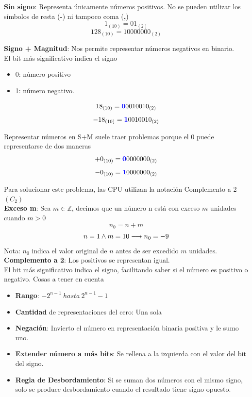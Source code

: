 \documentclass[10pt,a4paper]{article}
\begin{document}
\textbf{Sin signo}: Representa únicamente números positivos. No se pueden utilizar los símbolos de resta (\textbf{-}) ni tampoco coma (\textbf{,})
\[1_{(10)} = 01_{(2)}\]
\[128_{(10)} = 1000 0000_{(2)}\]

\textbf{Signo + Magnitud}: Nos permite representar números negativos en binario. \\ El bit más significativo indica el signo
\begin{itemize}
    \item 0: número positivo
    \item 1: número negativo.
\end{itemize}

\[18_{(10)} = \textcolor{blue}{\textbf{0}}0010010_{(2)}\]
\[-18_{(10)} = \textcolor{blue}{\textbf{1}}0010010_{(2)}\]

Representar números en S+M suele traer problemas porque el 0 puede representarse de dos maneras
\[+0_{(10)} = \textcolor{blue}{\textbf{0}}0000000_{(2)}\]
\[-0_{(10)} = \textcolor{blue}{\textbf{1}}0000000_{(2)}\]

Para solucionar este problema, las CPU utilizan la notación Complemento a 2 \((C_{2})\) \\

\textbf{Exceso m}: Sea \( m \in \mathbb{Z} \), decimos que un número n está con exceso \(m\) unidades cuando \(m>0\) 
\[n_{0}=n+m\]
\[n=1 \land m=10 \longrightarrow n_{0}=-9 \]
Nota: \(n_{0}\) indica el valor original de \(n\)  antes de ser excedido \(m\) unidades.  \\

\textbf{Complemento a 2}: Los positivos se representan igual. \\ 
El bit más significativo indica el signo, facilitando saber si el número es positivo o negativo.
Cosas a tener en cuenta
\begin{itemize}
    \item \textbf{Rango}: \( -2^{n-1} \ hasta \ 2^{n-1}-1 \)
    \item \textbf{Cantidad} de representaciones del cero: Una sola
    \item \textbf{Negación}: Invierto el número en representación binaria positiva y le sumo uno.
    \item \textbf{Extender número a más bits}: Se rellena a la izquierda con el valor del bit del signo.
    \item \textbf{Regla de Desbordamiento}: Si se suman dos números con el mismo signo, solo se produce desbordamiento cuando el resultado tiene signo opuesto.
\end{itemize}
\end{document}
